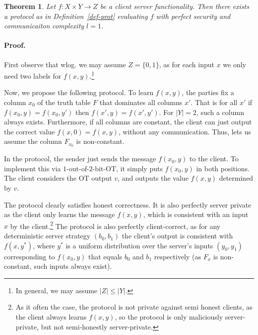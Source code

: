 \documentclass[a4paper]{article}
\newtheorem{theorem}{Theorem}[section]
\newcommand{\OT}[2]{#1\text{-out-of-}#2\text{-bit-OT}}
\begin{document}
\begin{theorem}
	Let $f:X\times Y\rightarrow Z$ be a client server functionality. Then there exists a protocol as in Definition~\ref{def-prot} evaluating $f$ with perfect security and communicaiton complexity $l=1$.
\end{theorem}

\paragraph{Proof.}

First observe that wlog. we may assume $Z=\{0,1\}$, as for each input $x$ we only need two labels for $f(x,y)$.\footnote{In general, we may assume $|Z|\leq |Y|$.}

Now, we propose the following protocol.
To learn $f(x,y)$, the parties fix a column $x_0$ of the truth table $F$ that dominates all columns $x'$. That is for all $x'$ if $f(x_0,y)=f(x_0,y')$ then $f(x',y)=f(x',y')$. For $|Y|=2$, such a column always exists.
Furthermore, if all columns are constant, the client can just output the correct value $f(x,0)=f(x,y)$, without any communication.
Thus, lets us assume the column $F_{x_0}$ is non-constant.

In the protocol, the sender just sends the message $f(x_0,y)$ to the client. To implement this via $\OT{1}{2}$, it simply puts $f(x_0,y)$ in both positions.
The client considers the OT output $v$, and outputs the value $f(x,y)$ determined by $v$.

The protocol clearly satisfies honest correctness.
It is also perfectly server private as the client only learns the message $f(x,y)$, which is consistent with an input $x$ by the client.\footnote{As it often the case, the protocol is not private against semi honest clients, as the client always learns $f(x,y)$, so the protocol is only maliciously server-private, but not semi-honestly server-private.} The protocol is also perfectly client-correct, as for any deterministic server strategy $(b_0,b_1)$ the client's output is consistent with $f(x,y^*)$, where $y^*$ is a uniform distribution over the server's inputs $(y_0,y_1)$ corresponding to $f(x_0,y)$ that equals $b_0$ and $b_1$ respectively (as $F_x$ is non-constant, such inputs always exist).
\end{document}
